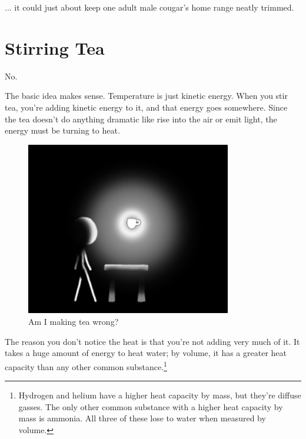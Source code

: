 {{... it could just about keep one adult male cougar's home range neatly trimmed.}

{
\chapter{Stirring Tea}
}

\hfill{}

{No.}

{The basic idea makes sense. Temperature is just kinetic energy. When you stir tea, you're adding kinetic energy to it, and that energy goes somewhere. Since the tea doesn't do anything dramatic like rise into the air or emit light, the energy must be turning to heat.}

\begin{figure}[!htbp]
\centering
\includegraphics[scale=0.5, max width=0.8\textwidth]{imgs/a/71/tea_light.png}
\caption{Am I making tea wrong?}
\end{figure}

{The reason you don't notice the heat is that you're not adding very much of it. It takes a huge amount of energy to heat water; by volume, it has a greater heat capacity than any other common substance.{\footnote{Hydrogen and helium have a higher heat capacity by mass, but they're diffuse gasses. The only other common substance with a higher heat capacity by mass is ammonia. All three of these lose to water when measured by volume.} } }

}
